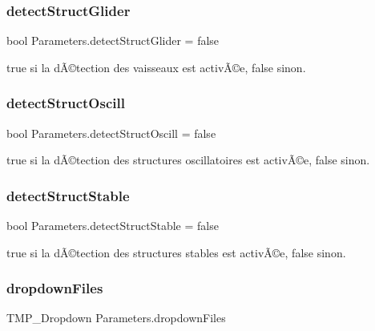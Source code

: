 \subsubsection{\texorpdfstring{detect\+Struct\+Glider}{detectStructGlider}}
{\footnotesize\ttfamily bool Parameters.\+detect\+Struct\+Glider = false\hspace{0.3cm}{\ttfamily [private]}}



true si la dÃ©tection des vaisseaux est activÃ©e, false sinon. 

\mbox{\label{class_parameters_a861434feae8c97b839615973c0e0e2ec}} 
\subsubsection{\texorpdfstring{detect\+Struct\+Oscill}{detectStructOscill}}
{\footnotesize\ttfamily bool Parameters.\+detect\+Struct\+Oscill = false\hspace{0.3cm}{\ttfamily [private]}}



true si la dÃ©tection des structures oscillatoires est activÃ©e, false sinon. 

\mbox{\label{class_parameters_a9cee3a4a38b1085ad46833289acf1336}} 
\subsubsection{\texorpdfstring{detect\+Struct\+Stable}{detectStructStable}}
{\footnotesize\ttfamily bool Parameters.\+detect\+Struct\+Stable = false\hspace{0.3cm}{\ttfamily [private]}}



true si la dÃ©tection des structures stables est activÃ©e, false sinon. 

\mbox{\label{class_parameters_ae4cea23bda0b2bc3955516a37e9d9993}} 
\subsubsection{\texorpdfstring{dropdown\+Files}{dropdownFiles}}
{\footnotesize\ttfamily T\+M\+P\+\_\+\+Dropdown Parameters.\+dropdown\+Files\hspace{0.3cm}{\ttfamily [private]}}



